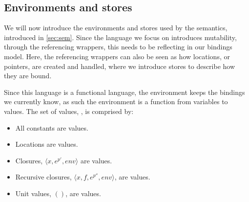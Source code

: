 \documentclass[../../master.tex]{subfiles}
\begin{document}
\iffalse
\begin{definition}[Bound variables]\label{def:bv}
	The set of bound variables is given by:
	\begin{align*}
		bv(x^p)&=\emptyset\\
		bv(c^p)&=\emptyset\\
		bv([\lambda\;y.e_1^{p'}]^p)&=bv(e_1^{p'})\cup\{y\}\\
		bv([e_1^{p'}\;e_2^{p''}]^p)&=bv(e_1^{p'})\cup bv(e_2^{p''})\\
		bv([\mbox{let}\;y\;e_1^{p'}\;e_2^{p''}]^p)&=bv(e_1^{p'})\cup bv(e_2^{p''})\cup\{y\}\\
		bv([\mbox{let rec}\;f\;e_1^{p'}\;e_2^{p''}]^p)&=bv(e_1^{p'})\cup bv(e_2^{p''})\cup\{f\}\\
		bv([\mbox{case}\;e^{p'}\;\pi^{p''}]^p)&=bv(e_1^{p'})\cup bv(\pi)\\
		bv([(s\;e^{p'})\;\pi])&=bv(e^{p'})\cup bv(\pi)\cup\tau(s)\\
		bv([(s\;e^{p'})])&=bv(e^{p'})\cup\tau(s)\\
		bv([\mbox{ref}\;e^{p'}]^p)&=bv(e^{p'})\\
		bv([!e^{p'}]^p)&=bv(e^{p'})\\
		bv([e_1^{p'}\;:=\;e_2^{p''}]^p)&=bv(e_1^{p'})\cup bv(e_2^{p''})\\
	\end{align*}
\end{definition}
\fi

\subsection{Environments and stores}\label{sec:EnvSto}
We will now introduce the environments and stores used by the semantics, introduced in \cref{sec:sem}.
Since the language we focus on introduces mutability, through the referencing wrappers, this needs to be reflecting in our bindings model.
Here, the referencing wrappers can also be seen as how locations, or pointers, are created and handled, where we introduce stores to describe how they are bound.

Since this language is a functional language, the environment keeps the bindings we currently know, as such the environment is a function from variables to values.
The set of values, , is comprised by:
\begin{itemize}
	\item All constants are values.
	\item Locations are values.
	\item Closures, $\langle x,e^{p'},env\rangle$ are values.
	\item Recursive closures, $\langle x,f,e^{p''},env\rangle$, are values.
	\item Unit values, $()$, are values.
\end{itemize}
\end{document}
